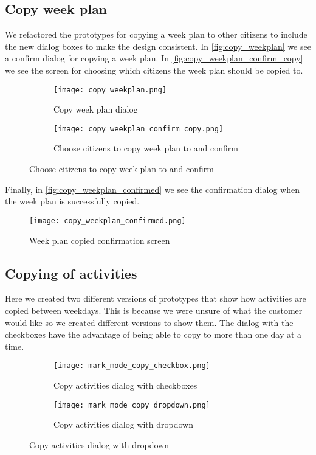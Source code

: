 \subsection{Copy week plan}
We refactored the prototypes for copying a week plan to other citizens to include the new dialog boxes to make the design consistent. In \autoref{fig:copy_weekplan} we see a confirm dialog for copying a week plan. In \autoref{fig:copy_weekplan_confirm_copy} we see the screen for choosing which citizens the week plan should be copied to. 
\begin{figure}[H]
    \begin{subfigure}{0.5\textwidth}
    \texttt{[image: copy\_weekplan.png]} 
    \caption{Copy week plan dialog}
    \label{fig:copy_weekplan}
    \end{subfigure}
    \begin{subfigure}{0.5\textwidth}
        \texttt{[image: copy\_weekplan\_confirm\_copy.png]}
    \caption{Choose citizens to copy week plan to and confirm}
    \label{fig:copy_weekplan_confirm_copy}
    \end{subfigure} 
\end{figure}
Finally, in \autoref{fig:copy_weekplan_confirmed} we see the confirmation dialog when the week plan is successfully copied.

\begin{figure}
    \centering
    \texttt{[image: copy\_weekplan\_confirmed.png]} 
    \caption{Week plan copied confirmation screen}
    \label{fig:copy_weekplan_confirmed}
\end{figure}

\subsection{Copying of activities}
Here we created two different versions of prototypes that show how activities are copied between weekdays. This is because we were unsure of what the customer would like so we created different versions to show them. The dialog with the checkboxes have the advantage of being able to copy to more than one day at a time.
\begin{figure}[H]
    \begin{subfigure}{0.5\textwidth}
    \texttt{[image: mark\_mode\_copy\_checkbox.png]} 
    \caption{Copy activities dialog with checkboxes}
    \label{fig:mark_mode_copy_checkbox}
    \end{subfigure}
    \begin{subfigure}{0.5\textwidth}
        \texttt{[image: mark\_mode\_copy\_dropdown.png]}
    \caption{Copy activities dialog with dropdown}
    \label{fig:mark_mode_copy_dropdown}
    \end{subfigure} 
\end{figure}


